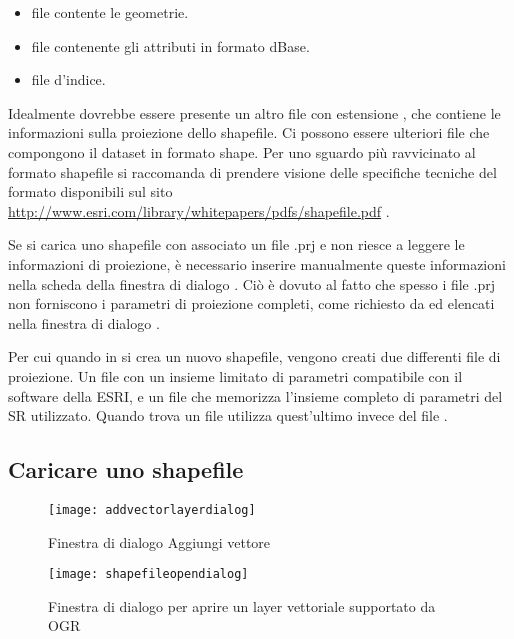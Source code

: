 \begin{itemize}
\item {} file contente le geometrie.
\item {} file contenente gli attributi in formato dBase.
\item {} file d'indice.
\end{itemize}

Idealmente dovrebbe essere presente un altro file con estensione
, che contiene le informazioni sulla proiezione dello
shapefile. Ci possono essere ulteriori file che compongono il dataset in
formato shape. Per uno sguardo più ravvicinato al formato shapefile si
raccomanda di prendere visione delle specifiche tecniche del formato
disponibili sul sito \url{http://www.esri.com/library/whitepapers/pdfs/shapefile.pdf}
.


Se si carica uno shapefile con associato un file .prj e \qg non riesce a leggere 
le informazioni di proiezione, è necessario inserire manualmente queste informazioni 
nella scheda  della finestra di dialogo . 
Ciò è dovuto al fatto che spesso i file .prj non forniscono i parametri di proiezione 
completi, come richiesto da \qg ed elencati nella finestra di dialogo .

Per cui quando in \qg si crea un nuovo shapefile, vengono creati due differenti file di 
proiezione. Un file  con un insieme limitato di parametri compatibile 
con il software della ESRI, e un file  che memorizza l'insieme completo 
di parametri del SR utilizzato. Quando \qg trova un file  utilizza quest'ultimo 
invece del file .

\subsection{Caricare uno shapefile}\label{sec:load_shapefile}

\begin{figure}[ht]
   \centering
   \texttt{[image: addvectorlayerdialog]}
   \caption{Finestra di dialogo Aggiungi vettore \nixcaption}\label{fig:addvectorlayer}
\end{figure}

\begin{figure}[ht]
   \centering
   \texttt{[image: shapefileopendialog]}
   \caption{Finestra di dialogo per aprire un layer vettoriale supportato da OGR \nixcaption}\label{fig:openshapefile}
\end{figure}

